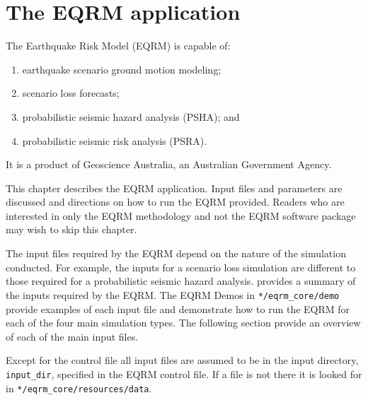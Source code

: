 \chapter{The EQRM application}
\label{ch:application}

The Earthquake Risk Model (EQRM) is capable of:
\begin{enumerate}
\item earthquake scenario ground motion modeling;
\item scenario loss forecasts;
\item probabilistic seismic hazard analysis (PSHA); and
\item  probabilistic seismic risk analysis (PSRA).
\end{enumerate}
It is a product of
Geoscience Australia, an Australian Government Agency.

This chapter describes the EQRM application. Input files and
parameters are discussed and directions on how to run the EQRM
provided. Readers who are interested in only the EQRM methodology
and not the EQRM software package may wish to skip this chapter.


The input files required by the EQRM depend on the nature of the
simulation conducted. For example, the inputs for a scenario loss
simulation are different to those required for a probabilistic
seismic hazard analysis.  provides a
summary of the inputs required by the EQRM. The EQRM Demos in
\texttt{*/eqrm\_core/demo} provide examples of each input file and
demonstrate how to run the EQRM for each of the four main simulation
types. The following section provide an overview of each of the main
input files.

Except for the control file all input files are assumed to be in the
input directory, \texttt{input\_dir}, specified in the EQRM control
file.  If a file is not there it is looked for in
\texttt{*/eqrm\_core/resources/data}.

